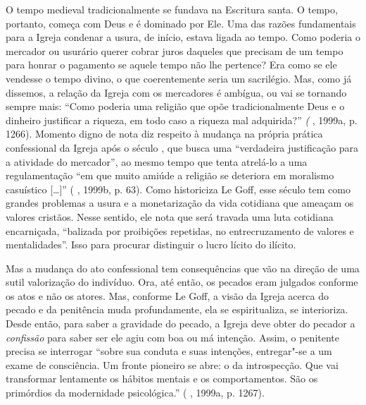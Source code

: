 O tempo medieval tradicionalmente se fundava na Escritura santa. O
tempo, portanto, começa com Deus e é dominado por Ele. Uma das razões
fundamentais para a Igreja condenar a usura, de início, estava ligada ao
tempo. Como poderia o mercador ou usurário querer cobrar juros daqueles
que precisam de um tempo para honrar o pagamento se aquele tempo não lhe
pertence? Era como se ele vendesse o tempo divino, o que coerentemente
seria um sacrilégio. Mas, como já dissemos, a relação da Igreja com os
mercadores é ambígua, ou vai se tornando sempre mais: ``Como poderia uma
religião que opõe tradicionalmente Deus e o dinheiro justificar a
riqueza, em todo caso a riqueza mal adquirida?'' \emph{(} , 1999a,
p. 1266). Momento digno de nota diz respeito à mudança na própria
prática confessional da Igreja após o século , que busca uma
``verdadeira justificação para a atividade do mercador'', ao mesmo tempo
que tenta atrelá-lo a uma regulamentação ``em que muito amiúde a
religião se deteriora em moralismo casuístico [\ldots{}]'' (
, 1999b, p. 63). Como historiciza Le Goff, esse século tem
como grandes problemas a usura e a monetarização da vida cotidiana que
ameaçam os valores cristãos. Nesse sentido, ele nota que será travada
uma luta cotidiana encarniçada, ``balizada por proibições repetidas, no
entrecruzamento de valores e mentalidades''. Isso para procurar
distinguir o lucro lícito do ilícito.

Mas a mudança do ato confessional tem consequências que vão na direção
de uma sutil valorização do indivíduo. Ora, até então, os pecados eram
julgados conforme os atos e não os atores. Mas, conforme Le Goff, a
visão da Igreja acerca do pecado e da penitência muda profundamente, ela
se espiritualiza, se interioriza. Desde então, para saber a gravidade do
pecado, a Igreja deve obter do pecador a \emph{confissão} para saber ser
ele agiu com boa ou má intenção. Assim, o penitente precisa se
interrogar ``sobre sua conduta e suas intenções, entregar"-se a um exame
de consciência. Um fronte pioneiro se abre: o da introspecção. Que vai
transformar lentamente os hábitos mentais e os comportamentos. São os
primórdios da modernidade psicológica.'' ( , 1999a, p. 1267).

